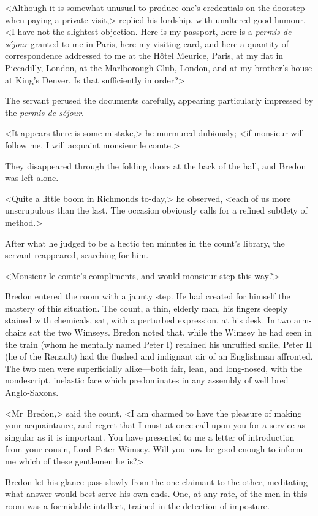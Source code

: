 <Although it is somewhat unusual to produce one's credentials on the doorstep when paying a private visit,> replied his lordship, with unaltered good humour, <I have not the slightest objection. Here is my passport, here is a \textit{permis de séjour} granted to me in Paris, here my visiting-card, and here a quantity of correspondence addressed to me at the Hôtel Meurice, Paris, at my flat in Piccadilly, London, at the Marlborough Club, London, and at my brother's house at King's Denver. Is that sufficiently in order?>

The servant perused the documents carefully, appearing particularly impressed by the \textit{permis de séjour}.

<It appears there is some mistake,> he murmured dubiously; <if monsieur will follow me, I will acquaint monsieur le comte.>

They disappeared through the folding doors at the back of the hall, and Bredon was left alone.

<Quite a little boom in Richmonds to-day,> he observed, <each of us more unscrupulous than the last. The occasion obviously calls for a refined subtlety of method.>

After what he judged to be a hectic ten minutes in the count's library, the servant reappeared, searching for him.

<Monsieur le comte's compliments, and would monsieur step this way?>

Bredon entered the room with a jaunty step. He had created for himself the mastery of this situation. The count, a thin, elderly man, his fingers deeply stained with chemicals, sat, with a perturbed expression, at his desk. In two arm-chairs sat the two Wimseys. Bredon noted that, while the Wimsey he had seen in the train (whom he mentally named Peter I) retained his unruffled smile, Peter II (he of the Renault) had the flushed and indignant air of an Englishman affronted. The two men were superficially alike—both fair, lean, and long-nosed, with the nondescript, inelastic face which predominates in any assembly of well bred Anglo-Saxons.

<Mr~Bredon,> said the count, <I am charmed to have the pleasure of making your acquaintance, and regret that I must at once call upon you for a service as singular as it is important. You have presented to me a letter of introduction from your cousin, Lord~Peter Wimsey. Will you now be good enough to inform me which of these gentlemen he is?>

Bredon let his glance pass slowly from the one claimant to the other, meditating what answer would best serve his own ends. One, at any rate, of the men in this room was a formidable intellect, trained in the detection of imposture.

